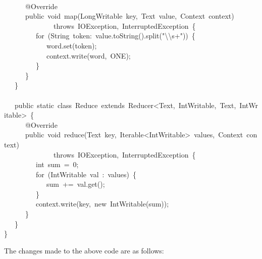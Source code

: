 \documentclass{article}
\begin{document}
\begin{mdpre}
\\
~~~~~~@Override\\
~~~~~~{public}~{void}~map(LongWritable~key,~Text~value,~Context~context)\\
~~~~~~~~~~~~~~{throws}~IOException,~InterruptedException~\{\\
~~~~~~~~~{for}~(String~token:~value.{toString}().split({"}{\textbackslash{}\textbackslash{}}{s+}{"}))~\{\\
~~~~~~~~~~~~word.set(token);\\
~~~~~~~~~~~~context.write(word,~ONE);\\
~~~~~~~~~\}\\
~~~~~~\}\\
~~~\}\\
\\
~~~{public}~{static}~{class}~Reduce~{extends}~Reducer\textless{}Text,~IntWritable,~Text,~IntWritable\textgreater{}~\{\\
~~~~~~@Override\\
~~~~~~{public}~{void}~reduce(Text~key,~Iterable\textless{}IntWritable\textgreater{}~values,~Context~context)\\
~~~~~~~~~~~~~~{throws}~IOException,~InterruptedException~\{\\
~~~~~~~~~{int}~sum~=~{0};\\
~~~~~~~~~{for}~(IntWritable~val~:~values)~\{\\
~~~~~~~~~~~~sum~+=~val.get();\\
~~~~~~~~~\}\\
~~~~~~~~~context.write(key,~{new}~IntWritable(sum));\\
~~~~~~\}\\
~~~\}\\
\}\\
\end{mdpre}\noindent The changes made to the above code are as follows: 
\end{document}
